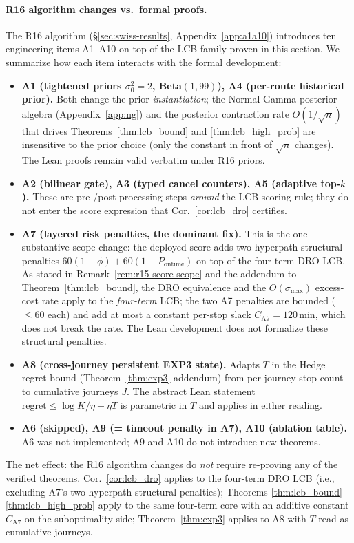 \documentclass[11pt]{article}
\theoremstyle{definition}
\theoremstyle{remark}
\begin{document}
\paragraph{R16 algorithm changes vs.\ formal proofs.}
The R16 algorithm (\S\ref{sec:swiss-results},
Appendix~\ref{app:a1a10}) introduces ten engineering items A1--A10
on top of the LCB family proven in this section. We summarize how
each item interacts with the formal development:
\begin{itemize}[leftmargin=1.5em,itemsep=0.15em]
\item \textbf{A1 (tightened priors $\sigma_0^2{=}2$, Beta$(1,99)$),
A4 (per-route historical prior).} Both change the prior
\emph{instantiation}; the Normal-Gamma posterior algebra
(Appendix~\ref{app:ng}) and the posterior contraction rate
$O(1/\sqrt n)$ that drives Theorems~\ref{thm:lcb_bound} and
\ref{thm:lcb_high_prob} are insensitive to the prior choice
(only the constant in front of $\sqrt n$ changes). The Lean proofs
remain valid verbatim under R16 priors.
\item \textbf{A2 (bilinear gate), A3 (typed cancel counters), A5
(adaptive top-$k$).} These are pre-/post-processing steps
\emph{around} the LCB scoring rule; they do not enter the score
expression that Cor.~\ref{cor:lcb_dro} certifies.
\item \textbf{A7 (layered risk penalties, the dominant fix).}
This is the one substantive scope change: the deployed score adds
two hyperpath-structural penalties $60(1{-}\phi) + 60(1{-}P_{\text{ontime}})$
on top of the four-term DRO LCB. As stated in
Remark~\ref{rem:r15-score-scope} and the addendum to
Theorem~\ref{thm:lcb_bound}, the DRO equivalence and the
$O(\sigma_{\max})$ excess-cost rate apply to the
\emph{four-term} LCB; the two A7 penalties are bounded
($\leq 60$ each) and add at most a constant per-stop slack
$C_{\mathrm{A7}} = 120$\,min, which does not break the rate.
The Lean development does not formalize these structural
penalties.
\item \textbf{A8 (cross-journey persistent EXP3 state).} Adapts
$T$ in the Hedge regret bound (Theorem~\ref{thm:exp3} addendum)
from per-journey stop count to cumulative journeys $J$. The
abstract Lean statement $\mathrm{regret}\leq \log K/\eta + \eta T$
is parametric in $T$ and applies in either reading.
\item \textbf{A6 (skipped), A9 (= timeout penalty in A7), A10
(ablation table).} A6 was not implemented; A9 and A10 do not
introduce new theorems.
\end{itemize}
The net effect: the R16 algorithm changes do \emph{not} require
re-proving any of the verified theorems. Cor.~\ref{cor:lcb_dro}
applies to the four-term DRO LCB (i.e., excluding A7's two
hyperpath-structural penalties); Theorems
\ref{thm:lcb_bound}--\ref{thm:lcb_high_prob} apply to the same
four-term core with an additive constant $C_{\mathrm{A7}}$ on the
suboptimality side; Theorem~\ref{thm:exp3} applies to A8 with
$T$ read as cumulative journeys.
\end{document}
